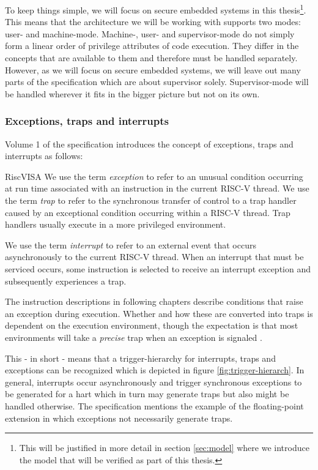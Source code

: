 To keep things simple, we will focus on secure embedded systems in this thesis\footnote{%
    This will be justified in more detail in section \ref{sec:model} where we introduce the model that will be verified as part of this thesis.
}.
This means that the architecture we will be working with supports two modes: user- and machine-mode.
Machine-, user- and supervisor-mode do not simply form a linear order of privilege attributes of code execution.
They differ in the concepts that are available to them and therefore must be handled separately.
However, as we will focus on secure embedded systems, we will leave out many parts of the specification which are about supervisor solely.
Supervisor-mode will be handled wherever it fits in the bigger picture but not on its own.

\subsubsection{Exceptions, traps and interrupts}
\label{sec:rv-exn}

Volume 1 of the specification introduces the concept of exceptions, traps and interrupts as follows:
\begin{displaycquote}{RiscVISA}
    We use the term \textit{exception} to refer to an unusual condition occurring at run time associated with an instruction in the current RISC-V thread.
    We use the term \textit{trap} to refer to the synchronous transfer of control to a trap handler caused by an exceptional condition occurring within a RISC-V thread.
    Trap handlers usually execute in a more privileged environment.

    We use the term \textit{interrupt} to refer to an external event that occurs asynchronously to the current RISC-V thread.
    When an interrupt that must be serviced occurs, some instruction is selected to receive an interrupt exception and subsequently experiences a trap.

    The instruction descriptions in following chapters describe conditions that raise an exception during execution.
    Whether and how these are converted into traps is dependent on the execution environment, though the expectation is that most environments will take a \textit{precise} trap when an exception is signaled \textelp{}.
\end{displaycquote}

This - in short - means that a trigger-hierarchy for interrupts, traps and exceptions can be recognized which is depicted in figure \ref{fig:trigger-hierarch}.
In general, interrupts occur asynchronously and trigger synchronous exceptions to be generated for a \gls{hart} which in turn may generate traps but also might be handled otherwise.
The specification mentions the example of the floating-point extension in which exceptions not necessarily generate traps.

